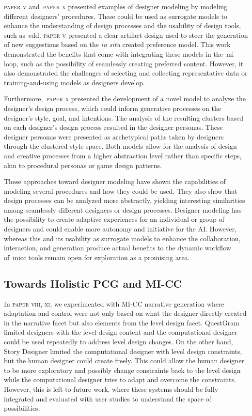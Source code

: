 \textsc{paper v} and~\textsc{paper x} presented examples of designer modeling by modeling different designers' procedures. These could be used as surrogate models to enhance the understanding of design processes and the usability of design tools, such as~\acrshort{edd}. \textsc{paper v} presented a clear artifact design used to steer the generation of new suggestions based on the \textit{in situ} created preference model. This work demonstrated the benefits that come with integrating these models in the~\acrshort{mi} loop, such as the possibility of seamlessly creating preferred content. However, it also demonstrated the challenges of selecting and collecting representative data or training-and-using models as designers develop.

Furthermore,~\textsc{paper x} presented the development of a novel model to analyze the designer's design process, which could inform generative processes on the designer's style, goal, and intentions. The analysis of the resulting clusters based on each designer's design process resulted in the designer personas. These designer personas were presented as archetypical paths taken by designers through the clustered style space. Both models allow for the analysis of design and creative processes from a higher abstraction level rather than specific steps, akin to procedural personas or game design patterns. 

These approaches toward designer modeling have shown the capabilities of modeling several procedures and how they could be used. They also show that design processes can be analyzed more abstractly, yielding interesting similarities among seamlessly different designers or design processes. Designer modeling has the possibility to create adaptive experiences for an individual or group of designers and could enable more autonomy and initiative for the AI. However, whereas this and its usability as surrogate models to enhance the collaboration, interaction, and generation produce actual benefits to the dynamic workflow of~\acrshort{micc} tools remain open for exploration as a promising area.

\subsection{Towards Holistic PCG and MI-CC}

In \textsc{paper viii, xi}, we experimented with MI-CC narrative generation where adaptation and control were not only based on what the designer directly created in the narrative facet but also elements from the level design facet. QuestGram limited designers with the level design content and the computational designer could be used repeatedly to address level design changes. On the other hand, Story Designer limited the computational designer with level design constraints, but the human designer could create freely. This could allow the human designer to be more exploratory and possibly change constraints back to the level design while the computational designer tries to adapt and overcome the constraints. However, this is left to future work, where these systems should be fully integrated and evaluated with user studies to understand the space of possibilities.

